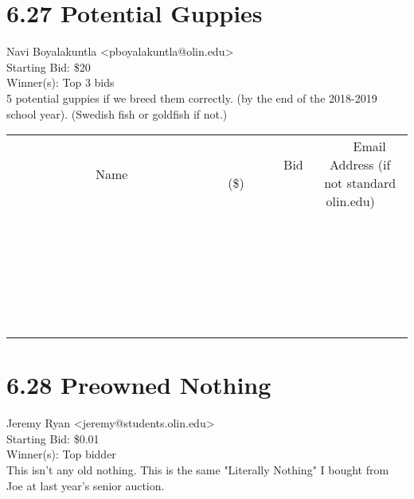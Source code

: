 \documentclass[11pt]{article}
\begin{document}
					\section*{6.27 Potential Guppies}
					Navi Boyalakuntla <pboyalakuntla@olin.edu> \\
					Starting Bid: \$20 \\
					Winner(s): Top 3 bids \\
					5 potential guppies if we breed them correctly. (by the end of the 2018-2019 school year). (Swedish fish or goldfish if not.) \\
					[6ex]
					\begin{tabular}{c c c}
						~~~~~~~~~~~~~Name~~~~~~~~~~~~~ & ~~~~~~~~~Bid (\$)~~~~~~~~~ & ~~~Email Address (if not standard olin.edu)~~~ \\
				
 & & \\
\hline
 & & \\
\hline
 & & \\
\hline
 & & \\
\hline
 & & \\
\hline
 & & \\
\hline
 & & \\
\hline
 & & \\
\hline
 & & \\
\hline
 & & \\
\hline
 & & \\
\hline
 & & \\
\hline
 & & \\
\hline
 & & \\
\hline
 & & \\
\hline
 & & \\
\hline
 & & \\
\hline
 & & \\
\hline
 & & \\
\hline
 & & \\
\hline
 & & \\
\hline
 & & \\
\hline
 & & \\
\hline
 & & \\
\hline
 & & \\
\hline
 & & \\
\hline
					\end{tabular}
					\clearpage
				
					\section*{6.28 Preowned Nothing}
					Jeremy Ryan <jeremy@students.olin.edu> \\
					Starting Bid: \$0.01 \\
					Winner(s): Top bidder \\
					This isn't any old nothing. This is the same "Literally Nothing" I bought from Joe at last year's senior auction.
\end{document}
